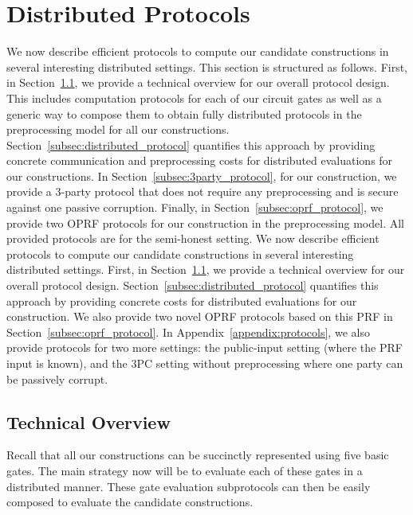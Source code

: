 \section{Distributed Protocols}
\label{sec:distributed_protocols}
\iffull
We now describe efficient protocols to compute our candidate constructions in several interesting distributed settings. This section is structured as follows. First, in Section~\ref{subsec:protocol_overview}, we provide a technical overview for our overall protocol design. This includes computation protocols for each of our circuit gates as well as a generic way to compose them to obtain fully distributed protocols in the preprocessing model for all our constructions. Section~\ref{subsec:distributed_protocol} quantifies this approach by providing concrete communication and preprocessing costs for distributed evaluations for our constructions. In Section~\ref{subsec:3party_protocol}, for our \ttwPRF construction, we provide a 3-party protocol that does not require any preprocessing and is secure against one passive corruption. Finally, in Section~\ref{subsec:oprf_protocol}, we provide two OPRF protocols for our \ttwPRF construction in the preprocessing model. All provided protocols are for the semi-honest setting.
\else
We now describe efficient protocols to compute our candidate constructions in several interesting distributed settings. First, in Section~\ref{subsec:protocol_overview}, we provide a technical overview for our overall protocol design. Section~\ref{subsec:distributed_protocol} quantifies this approach by providing concrete costs for distributed evaluations for our \ttwPRF construction. We also provide two novel OPRF protocols based on this PRF in Section~\ref{subsec:oprf_protocol}. 
In Appendix~\ref{appendix:protocols}, we also provide protocols for two more settings: the public-input setting (where the PRF input is known), and the 3PC setting without preprocessing where one party can be passively corrupt.
\fi



\subsection{Technical Overview}
\label{subsec:protocol_overview}
Recall that all our constructions can be succinctly represented using five basic gates. The main strategy now will be to evaluate each of these gates in a distributed manner. These gate evaluation subprotocols can then be easily composed to evaluate the  candidate constructions. 

